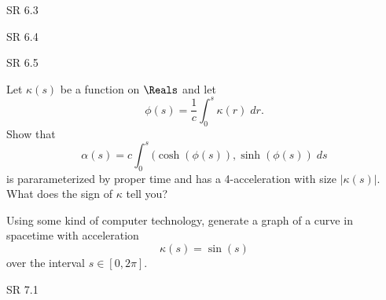 \documentclass[minion]{homework}
\begin{document}
\begin{aproblems}

\hproblem SR 6.3

\hproblem SR 6.4

\hproblem SR 6.5


\hproblem 
Let $\kappa(s)$ be a function on $\Reals$ and let
\begin{equation}
\phi(s) = \frac{1}{c} \int_0^s \kappa(r)\; dr.
\end{equation}
Show that
\begin{equation}
\alpha(s) = c \int_0^s (\cosh(\phi(s)),\sinh(\phi(s))\; ds
\end{equation}
is pararameterized by proper time and has a 4-acceleration with
size $|\kappa(s)|$.  What does the sign of $\kappa$ tell you?

\hproblem Using some kind of computer technology, generate a graph of a curve in spacetime with acceleration 
\begin{equation}
\kappa(s) = \sin(s)
\end{equation}
over the interval $s\in [0,2\pi]$.

\hproblem SR 7.1


\end{aproblems}
\end{document}
